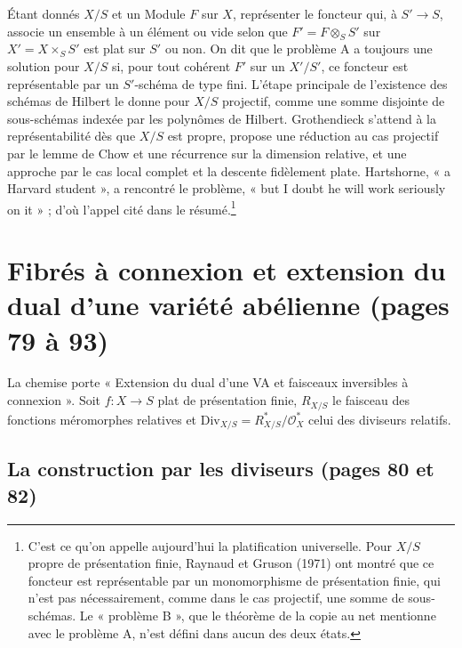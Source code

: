 \documentclass[11pt,a4paper]{article}
\begin{document}
Étant donnés $X/S$ et un Module $F$ sur $X$, représenter le foncteur qui, à
$S' \to S$, associe un ensemble à un élément ou vide selon que
$F' = F \otimes_S S'$ sur $X' = X \times_S S'$ est plat sur $S'$ ou non. On
dit que le problème A a toujours une solution pour $X/S$ si, pour tout
cohérent $F'$ sur un $X'/S'$, ce foncteur est représentable par un $S'$-schéma
de type fini. L'étape principale de l'existence des schémas de Hilbert le
donne pour $X/S$ projectif, comme une somme disjointe de sous-schémas indexée
par les polynômes de Hilbert. Grothendieck s'attend à la représentabilité dès
que $X/S$ est propre, propose une réduction au cas projectif par le lemme de
Chow et une récurrence sur la dimension relative, et une approche par le cas
local complet et la descente fidèlement plate. Hartshorne, « a Harvard
student », a rencontré le problème, « but I doubt he will work seriously on
it » ; d'où l'appel cité dans le résumé.\footnote{C'est ce qu'on appelle
aujourd'hui la platification universelle. Pour $X/S$ propre de présentation
finie, Raynaud et Gruson (1971) ont montré que ce foncteur est représentable
par un monomorphisme de présentation finie, qui n'est pas nécessairement, comme
dans le cas projectif, une somme de sous-schémas. Le « problème B », que le théorème de la copie au net
mentionne avec le problème A, n'est défini dans aucun des deux états.}

\section*{Fibrés à connexion et extension du dual d'une variété abélienne (pages 79 à 93)}

La chemise porte « Extension du dual d'une VA et faisceaux inversibles à
connexion ». Soit $f \colon X \to S$ plat de présentation finie, $R_{X/S}$ le
faisceau des fonctions méromorphes relatives et
$\mathrm{Div}_{X/S} = R^*_{X/S}/\mathcal{O}^*_X$ celui des diviseurs relatifs.

\subsection*{La construction par les diviseurs (pages 80 et 82)}
\end{document}
